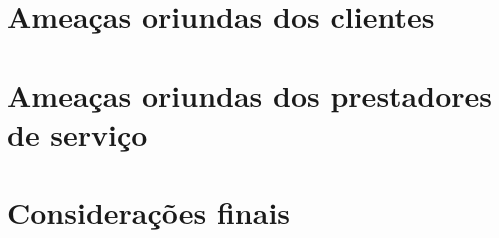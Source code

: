 
\section{Ameaças oriundas dos clientes}
\label{sec:ameacas_clientes}

\section{Ameaças oriundas dos prestadores de serviço}
\label{sec:ameacas_prestadores}

\section{Considerações finais}
\label{sec:consideracoes_ameacas}



%

